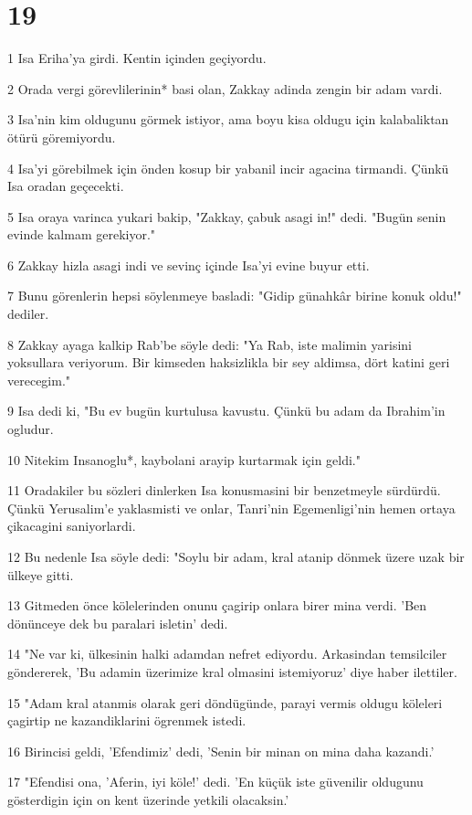 \chapter{19}

\par 1 Isa Eriha'ya girdi. Kentin içinden geçiyordu.
\par 2 Orada vergi görevlilerinin* basi olan, Zakkay adinda zengin bir adam vardi.
\par 3 Isa'nin kim oldugunu görmek istiyor, ama boyu kisa oldugu için kalabaliktan ötürü göremiyordu.
\par 4 Isa'yi görebilmek için önden kosup bir yabanil incir agacina tirmandi. Çünkü Isa oradan geçecekti.
\par 5 Isa oraya varinca yukari bakip, "Zakkay, çabuk asagi in!" dedi. "Bugün senin evinde kalmam gerekiyor."
\par 6 Zakkay hizla asagi indi ve sevinç içinde Isa'yi evine buyur etti.
\par 7 Bunu görenlerin hepsi söylenmeye basladi: "Gidip günahkâr birine konuk oldu!" dediler.
\par 8 Zakkay ayaga kalkip Rab'be söyle dedi: "Ya Rab, iste malimin yarisini yoksullara veriyorum. Bir kimseden haksizlikla bir sey aldimsa, dört katini geri verecegim."
\par 9 Isa dedi ki, "Bu ev bugün kurtulusa kavustu. Çünkü bu adam da Ibrahim'in ogludur.
\par 10 Nitekim Insanoglu*, kaybolani arayip kurtarmak için geldi."
\par 11 Oradakiler bu sözleri dinlerken Isa konusmasini bir benzetmeyle sürdürdü. Çünkü Yerusalim'e yaklasmisti ve onlar, Tanri'nin Egemenligi'nin hemen ortaya çikacagini saniyorlardi.
\par 12 Bu nedenle Isa söyle dedi: "Soylu bir adam, kral atanip dönmek üzere uzak bir ülkeye gitti.
\par 13 Gitmeden önce kölelerinden onunu çagirip onlara birer mina verdi. 'Ben dönünceye dek bu paralari isletin' dedi.
\par 14 "Ne var ki, ülkesinin halki adamdan nefret ediyordu. Arkasindan temsilciler göndererek, 'Bu adamin üzerimize kral olmasini istemiyoruz' diye haber ilettiler.
\par 15 "Adam kral atanmis olarak geri döndügünde, parayi vermis oldugu köleleri çagirtip ne kazandiklarini ögrenmek istedi.
\par 16 Birincisi geldi, 'Efendimiz' dedi, 'Senin bir minan on mina daha kazandi.'
\par 17 "Efendisi ona, 'Aferin, iyi köle!' dedi. 'En küçük iste güvenilir oldugunu gösterdigin için on kent üzerinde yetkili olacaksin.'
